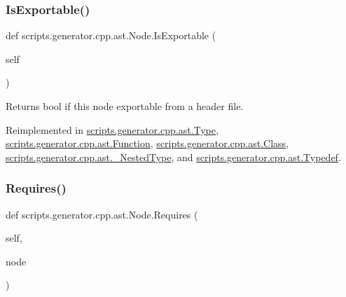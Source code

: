 \mbox{\label{classscripts_1_1generator_1_1cpp_1_1ast_1_1_node_a298c446d34e08a78b5ebb477eb55863b}} 
\subsubsection{\texorpdfstring{IsExportable()}{IsExportable()}}
{\footnotesize\ttfamily def scripts.\+generator.\+cpp.\+ast.\+Node.\+Is\+Exportable (\begin{DoxyParamCaption}\item[{}]{self }\end{DoxyParamCaption})}

\begin{DoxyVerb}Returns bool if this node exportable from a header file.\end{DoxyVerb}
 

Reimplemented in \mbox{\hyperlink{classscripts_1_1generator_1_1cpp_1_1ast_1_1_type_aa0c2d113f68d04b247025b9e2956a78c}{scripts.\+generator.\+cpp.\+ast.\+Type}}, \mbox{\hyperlink{classscripts_1_1generator_1_1cpp_1_1ast_1_1_function_a1920a361baf96f213a642d0a1a9a43c8}{scripts.\+generator.\+cpp.\+ast.\+Function}}, \mbox{\hyperlink{classscripts_1_1generator_1_1cpp_1_1ast_1_1_class_a56180abf003818d8d244fb38b4845e0e}{scripts.\+generator.\+cpp.\+ast.\+Class}}, \mbox{\hyperlink{classscripts_1_1generator_1_1cpp_1_1ast_1_1___nested_type_a0fc2d545ab6fbdbd9de1e5674ce923c6}{scripts.\+generator.\+cpp.\+ast.\+\_\+\+Nested\+Type}}, and \mbox{\hyperlink{classscripts_1_1generator_1_1cpp_1_1ast_1_1_typedef_a6912028a648a58d9167be022b7c48874}{scripts.\+generator.\+cpp.\+ast.\+Typedef}}.

\mbox{\label{classscripts_1_1generator_1_1cpp_1_1ast_1_1_node_a37c4215d199947155270a485a3add21e}} 
\subsubsection{\texorpdfstring{Requires()}{Requires()}}
{\footnotesize\ttfamily def scripts.\+generator.\+cpp.\+ast.\+Node.\+Requires (\begin{DoxyParamCaption}\item[{}]{self,  }\item[{}]{node }\end{DoxyParamCaption})}

